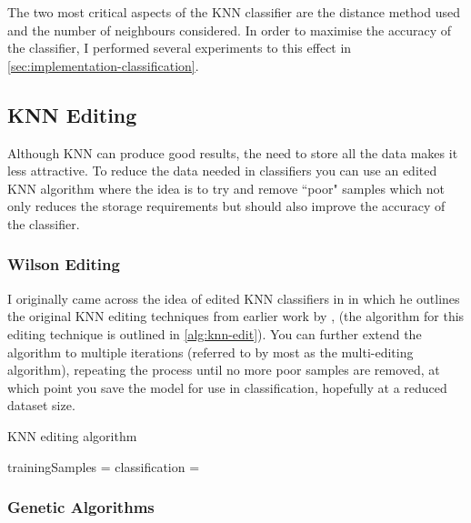 The two most critical aspects of the KNN classifier are the distance method used and the number of neighbours considered. In order to maximise the accuracy of the classifier, I performed several experiments to this effect in \cref{sec:implementation-classification}.

\subsection{KNN Editing}

Although KNN can produce good results, the need to store all the data makes it less attractive. To reduce the data needed in classifiers you can use an edited KNN algorithm where the idea is to try and remove ``poor" samples which not only reduces the storage requirements but should also improve the accuracy of the classifier.

\subsubsection{Wilson Editing}
I originally came across the idea of edited KNN classifiers in \cite{fujinaga1996adaptive} in which he outlines the original KNN editing techniques from earlier work by \cite{wilson1972asymptotic}, (the algorithm for this editing technique is outlined in \cref{alg:knn-edit}). You can further extend the algorithm to multiple iterations (referred to by most as the multi-editing algorithm), repeating the process until no more poor samples are removed, at which point you save the model for use in classification, hopefully at a reduced dataset size.

\begin{algorithm}[H]
  \caption{KNN editing algorithm}
  \label{alg:knn-edit}

  \begin{algorithmic}
        \State trainingSamples = 
          \State classification = 
          \EndIf
    	\EndFor
    \EndProcedure
  \end{algorithmic}
\end{algorithm}

\subsubsection{Genetic Algorithms}

